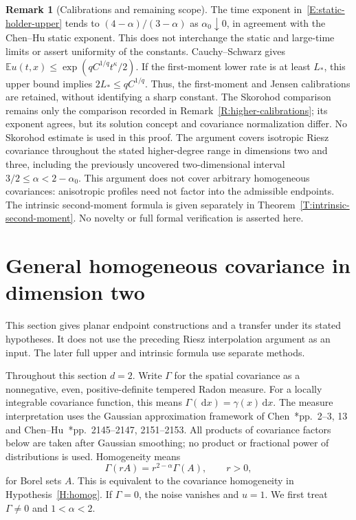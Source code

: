 \documentclass[12pt]{article}
\numberwithin{equation}{section}
\theoremstyle{definition}
\newtheorem{remark}[theorem]{Remark}
\newcommand{\E}{\mathbb{E}}
\newcommand{\ud}{\,\mathrm{d}}
\begin{document}
\begin{remark}[Calibrations and remaining scope]\label{R:static-holder-scope}
  The time exponent in~\eqref{E:static-holder-upper} tends to
  $(4-\alpha)/(3-\alpha)$ as $\alpha_0\downarrow0$, in agreement
  with the Chen--Hu static exponent. This does not interchange the
  static and large-time limits or assert uniformity of the constants.
  Cauchy--Schwarz gives $\E u(t,x)\le
  \exp(qC^{1/q}t^\kappa/2)$. If the first-moment lower rate is at
  least $L_*$, this upper bound implies $2L_*\le qC^{1/q}$.
  Thus, the first-moment and Jensen calibrations are retained, without
  identifying a sharp constant. The Skorohod comparison remains only
  the comparison recorded in Remark~\ref{R:higher-calibrations}; its
  exponent agrees, but its solution concept and covariance normalization
  differ. No Skorohod estimate is used in this proof. The argument covers
  isotropic Riesz covariance throughout the stated higher-degree range
  in dimensions two and three, including the previously uncovered
  two-dimensional interval $3/2\le\alpha<2-\alpha_0$.
  This argument does not cover arbitrary homogeneous covariances:
  anisotropic profiles need not factor into the admissible endpoints.
  The intrinsic second-moment formula is given separately in
  Theorem~\ref{T:intrinsic-second-moment}. No novelty or full formal
  verification is asserted here.
\end{remark}

\section{General homogeneous covariance in dimension two}
\label{S:planar-holder}

This section gives planar endpoint constructions and a transfer under
its stated hypotheses. It does not use the preceding Riesz interpolation
argument as an input. The later full upper and intrinsic formula use
separate methods.

Throughout this section $d=2$. Write $\Gamma$ for the spatial covariance
as a nonnegative, even, positive-definite tempered Radon measure. For a
locally integrable covariance function, this means
$\Gamma(\ud x)=\gamma(x)\ud x$. The measure interpretation uses the Gaussian
approximation framework of
Chen~\cite{chen:author2026:time-dependency}*{pp.~2--3, 13} and
Chen--Hu~\cite{chen.hu:25:hyperbolic}*{pp.~2145--2147, 2151--2153}.
All products of covariance factors below are taken after Gaussian smoothing;
no product or fractional power of distributions is used. Homogeneity means
\begin{equation}\label{E:planar-measure-scaling}
  \Gamma(rA)=r^{2-\alpha}\Gamma(A),\qquad r>0,
\end{equation}
for Borel sets $A$. This is equivalent to the covariance homogeneity in
Hypothesis~\ref{H:homog}. If $\Gamma=0$, the noise vanishes and $u=1$.
We first treat $\Gamma\ne0$ and $1<\alpha<2$.
\end{document}
